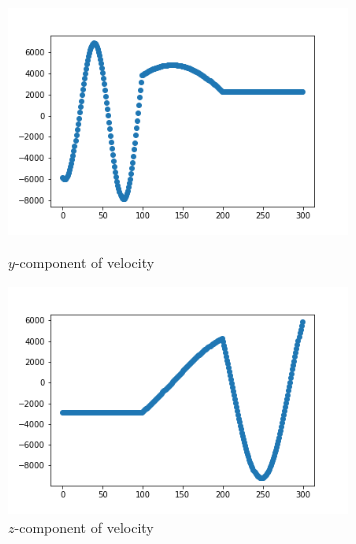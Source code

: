 \documentclass[12pt]{article}
\begin{document}
	\begin{figure}[H]
		\begin{multicols}{2}
			\includegraphics[width=\linewidth, height=6cm]{vsy2.png} \caption{$y$-component of velocity} \label{vsy2} \par
			\includegraphics[width=\linewidth, height=6cm]{vsz2.png} \caption{$z$-component of velocity} \label{vsz2} \par
		\end{multicols}
	\end{figure}
	
\end{document}
